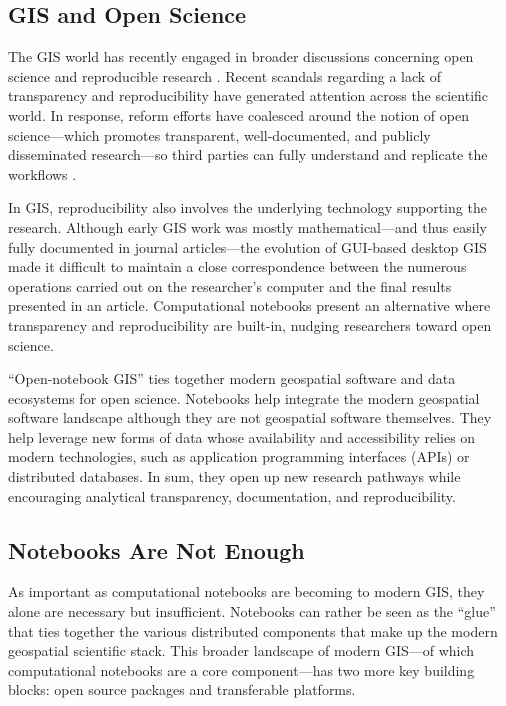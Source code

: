\documentclass[11pt,letterpaper]{article}
\begin{document}
\subsection{GIS and Open Science}

The GIS world has recently engaged in broader discussions concerning open science and reproducible research \citep{brunsdon_quantitative_2016,kedron_reproducibility_2019,kedron_reproducibility_2020}. Recent scandals regarding a lack of transparency and reproducibility have generated attention across the scientific world. In response, reform efforts have coalesced around the notion of open science---which promotes transparent, well-documented, and publicly disseminated research---so third parties can fully understand and replicate the workflows \citep{boeing_right_2020,koster_fueling_2020,wilson_five-star_2020,poorthuis_being_2019,rey_show_2009}.

In GIS, reproducibility also involves the underlying technology supporting the research. Although early GIS work was mostly mathematical---and thus easily fully documented in journal articles---the evolution of GUI-based desktop GIS made it difficult to maintain a close correspondence between the numerous operations carried out on the researcher's computer and the final results presented in an article. Computational notebooks present an alternative where transparency and reproducibility are built-in, nudging researchers toward open science.

\enquote{Open-notebook GIS} ties together modern geospatial software and data ecosystems for open science. Notebooks help integrate the modern geospatial software landscape although they are not geospatial software themselves. They help leverage new forms of data whose availability and accessibility relies on modern technologies, such as application programming interfaces (APIs) or distributed databases. In sum, they open up new research pathways while encouraging analytical transparency, documentation, and reproducibility.

\subsection{Notebooks Are Not Enough}

As important as computational notebooks are becoming to modern GIS, they alone are necessary but insufficient. Notebooks can rather be seen as the \enquote{glue} that ties together the various distributed components that make up the modern geospatial scientific stack. This broader landscape of modern GIS---of which computational notebooks are a core component---has two more key building blocks: open source packages and transferable platforms.
\end{document}
